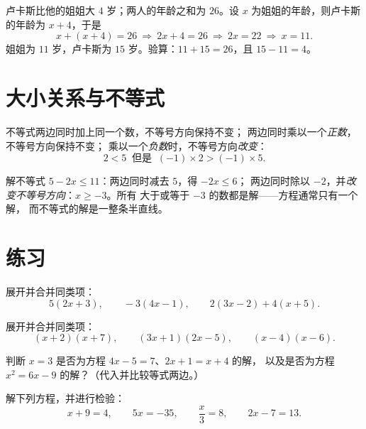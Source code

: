 \begin{example}\label{ex:g8:equations:problem}
卢卡斯比他的姐姐大 $4$ 岁；两人的年龄之和为
$26$。设 $x$ 为姐姐的年龄，则卢卡斯的年龄为 $x + 4$，于是
\[
x + (x + 4) = 26
\ \Longrightarrow\
2x + 4 = 26
\ \Longrightarrow\
2x = 22
\ \Longrightarrow\
x = 11 .
\]
姐姐为 $11$ 岁，卢卡斯为 $15$ 岁。验算：$11 + 15 = 26$，且
$15 - 11 = 4$。
\end{example}

\section{大小关系与不等式}

\begin{proposition}[运算与大小关系]\label{prop:g8:equations:order}
不等式两边同时加上同一个数，不等号方向保持不变；
两边同时乘以一个\emph{正数}，不等号方向保持不变；
乘以一个\emph{负数}时，不等号方向\emph{改变}：
\[
2 < 5 \ \text{ 但是 }\ (-1) \times 2 > (-1) \times 5 .
\]
\end{proposition}
\admitted

\begin{example}\label{ex:g8:equations:inequality}
解不等式 $5 - 2x \leq 11$：两边同时减去 $5$，得 $-2x \leq 6$；
两边同时除以 $-2$，并\emph{改变不等号方向}：$x \geq -3$。所有
大于或等于 $-3$ 的数都是解——方程通常只有一个解，
而不等式的解是一整条半直线。
\end{example}

\section{练习}

\begin{exercise}[$\star$]\label{exo:g8:equations:1}
展开并合并同类项：
\[
5(2x + 3), \qquad
-3(4x - 1), \qquad
2(3x - 2) + 4(x + 5).
\]
\end{exercise}

\begin{exercise}[$\star$]\label{exo:g8:equations:2}
展开并合并同类项：
\[
(x + 2)(x + 7), \qquad
(3x + 1)(2x - 5), \qquad
(x - 4)(x - 6).
\]
\end{exercise}

\begin{exercise}[$\star$]\label{exo:g8:equations:3}
判断 $x = 3$ 是否为方程 $4x - 5 = 7$、$2x + 1 = x + 4$ 的解，
以及是否为方程 $x^2 = 6x - 9$ 的解？（代入并比较等式两边。）
\end{exercise}

\begin{exercise}[$\star$]\label{exo:g8:equations:4}
解下列方程，并进行检验：
\[
x + 9 = 4, \qquad
5x = -35, \qquad
\frac{x}{3} = 8, \qquad
2x - 7 = 13 .
\]
\end{exercise}

